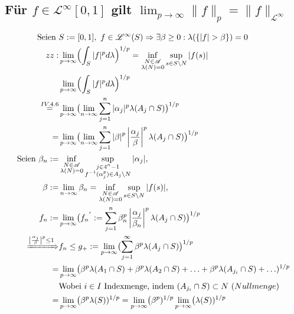 \documentclass[12pt,a4paper]{article}
\DeclareMathOperator*{\equals}{=}
\begin{document}
\subsection*{Für $f \in \mathscr{L}^{\infty}[0,1]$ gilt $\lim_{p \to\infty}\lVert f \rVert_p = \lVert f \rVert_{\mathscr{L}^{\infty}}$}
\begin{align*}
\text{Seien }& S := [0,1], \ f \in \mathscr{L}^{\infty}(S) \Rightarrow \exists \beta \geq 0: \lambda(\{|f| > \beta \})=0\\
zz: &\lim_{p\to\infty}\Bigl( \int_{S}|f|^p d\lambda \Bigr)^{1/p} = \inf_{\substack{N \in \mathscr{A} \\ \lambda(N)=0}} \sup_{s \in S\setminus N}|f(s)|\\
	&\lim_{p\to\infty}\Bigl( \int_{S}|f|^pd\lambda\Bigr)^{1/p}\\
	\equals^{IV.4.6}&\lim_{p\to\infty}\bigl(\lim_{n\to\infty}\sum_{j=1}^{n}|\alpha_{j}|^{p}\lambda(A_j \cap S)\bigr)^{1/p}\\
	=&\lim_{p\to\infty}\bigl(\lim_{n\to\infty}\sum_{j=1}^{n}\left\lvert\beta\right\lvert^p\left\lvert\frac{\alpha_{j}}{\beta}\right\lvert^{p}\lambda(A_j \cap S)\bigr)^{1/p}\\
\text{Seien } \beta_n := &\inf_{\substack{N \in \mathscr{A} \\ \lambda(N)=0}} \sup_{\substack{j \in 4^n-1\\f^{-1}(\alpha_{j}^p) \in A_j\setminus N}}|\alpha_j|,\\ \beta :=& \lim_{n \to \infty} \beta_n = \inf_{\substack{N \in \mathscr{A} \\ \lambda(N)=0}} \sup_{s \in S\setminus N}|f(s)|, \\
f_n := &\lim_{p\to\infty}\bigl({f_n}^{'}:=\sum_{j=1}^{n}\beta_n^p\left\lvert\frac{\alpha_{j}}{\beta_n}\right\lvert^{p}\lambda(A_j \cap S)\bigr)^{1/p}\\
\xRightarrow{\left\lvert\frac{\alpha_{j}}{\beta}\right\lvert^{p} \leq 1} &f_n \leq g_{+}:=\lim_{p\to\infty}\bigl(\sum_{j=1}^{\infty}\beta^p\lambda(A_j \cap S)\bigr)^{1/p}\\
	\equals &\lim_{p\to\infty}\bigl(\beta^p\lambda(A_1 \cap S) + \beta^p\lambda(A_2 \cap S)+ \ldots +\beta^p\lambda(A_{j_i} \cap S) + \ldots )^{1/p}\\
	&\text{Wobei } i \in I \text{ Indexmenge, indem } (A_{j_i} \cap S) \subset N\ (Nullmenge)\\
	=&\lim_{p\to\infty}\bigl(\beta^p\lambda(S))^{1/p} =\lim_{p\to\infty}\bigl(\beta^p)^{1/p} \lim_{p\to\infty}\bigl(\lambda(S))^{1/p} \\

\end{align*}
\end{document}
